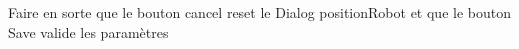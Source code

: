 
\begin{DoxyRefList}
\item[\label{todo__todo000001}%
\Hypertarget{todo__todo000001}%
Membre \hyperlink{class_fenetre_reglages_a158f8750273eb661e8f5bb6d14503b62}{Fenetre\+Reglages\+:\+:position\+Robot} ]Faire en sorte que le bouton cancel reset le Dialog position\+Robot et que le bouton Save valide les paramètres 
\end{DoxyRefList}